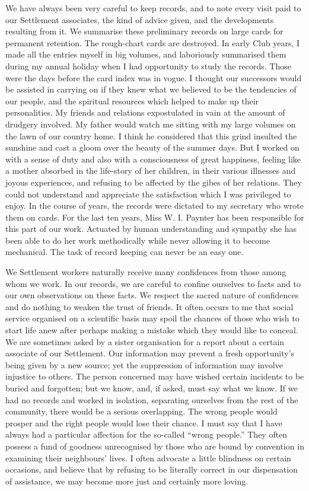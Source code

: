 We have always been very careful to keep records, and
to note every visit paid to our Settlement associates,
the kind of advice given, and the developments resulting
from it. We summarise these preliminary records on large
cards for permanent retention. The rough-chart cards are
destroyed. In early Club years, I made all the entries
myself in big volumes, and laboriously summarised them during
my annual holiday when I had opportunity to
study the records. Those were the days before the card
index was in vogue. I thought our successors would be
assisted in carrying on if they knew what we believed to
be the tendencies of our people, and the spiritual resources
which helped to make up their personalities. My friends
and relations expostulated in vain at the amount of
drudgery involved. My father would watch me sitting
with my large volumes on the lawn of our country home.
I think he considered that this grind insulted the sunshine
and cast a gloom over the beauty of the summer days.
But I worked on with a sense of duty and also with a consciousness
of great happiness, feeling like a mother
absorbed in the life-story of her children, in their various
illnesses and joyous experiences, and refusing to be
affected by the gibes of her relations. They could not
understand and appreciate the satisfaction which I was
privileged to enjoy. In the course of years, the records
were dictated to my secretary who wrote them on cards.
For the last ten years, Miss W. I. Paynter has been
responsible for this part of our work. Actuated by human
understanding and sympathy she has been able to do her
work methodically while never allowing it to become
mechanical. The task of record keeping can never be
an easy one.

We Settlement workers naturally receive many confidences
from those among whom we work. In our
records, we are careful to confine ourselves to facts and to
our own observations on these facts. We respect the
sacred nature of confidences and do nothing to weaken
the trust of friends. It often occurs to me that social service
organised on a scientific basis may spoil the chances
of those who wish to start life anew after perhaps making
a mistake which they would like to conceal. We are sometimes
asked by a sister organisation for a report about a
certain associate of our Settlement. Our information may
prevent a fresh opportunity’s being given by a new
source; yet the suppression of information may involve
injustice to others. The person concerned may have
wished certain incidents to be buried and forgotten; but
we know, and, if asked, must say what we know. If we
had no records and worked in isolation, separating ourselves
from the rest of the community, there would be a
serious overlapping. The wrong people would prosper
and the right people would lose their chance. I must say
that I have always had a particular affection for the so-called
“wrong people.” They often possess a fund of
goodness unrecognised by those who are bound by convention
in examining their neighbours’ lives. I often
advocate a little blindness on certain occasions, and believe
that by refusing to be literally correct in our dispensation
of assistance, we may become more just and
certainly more loving.

